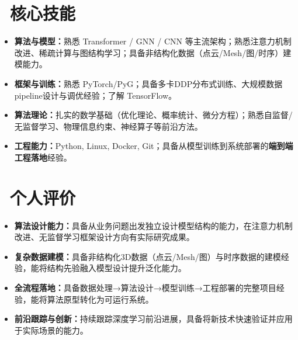 \documentclass[11pt]{article}
\begin{document}
  
\section{\makebox[\widthof{\faCogs}][c]{\color{CVBlue}\faCogs}\ 核心技能}
    
\begin{itemize}
    \item \textbf{算法与模型：}熟悉 Transformer / GNN / CNN 等主流架构；熟悉注意力机制改进、稀疏计算与图结构学习；具备非结构化数据（点云/Mesh/图/时序）建模能力。
    \item \textbf{框架与训练：}熟悉 PyTorch/PyG；具备多卡DDP分布式训练、大规模数据pipeline设计与调优经验；了解 TensorFlow。
    \item \textbf{算法理论：}扎实的数学基础（优化理论、概率统计、微分方程）；熟悉自监督/无监督学习、物理信息约束、神经算子等前沿方法。
    \item \textbf{工程能力：}Python, Linux, Docker, Git；具备从模型训练到系统部署的\textbf{端到端工程落地}经验。
\end{itemize}

\section{\makebox[\widthof{\faUser}][c]{\color{CVBlue}\faUser}\ 个人评价}

\begin{itemize}
    \item \textbf{算法设计能力：}具备从业务问题出发独立设计模型结构的能力，在注意力机制改进、无监督学习框架设计方向有实际研究成果。
    \item \textbf{复杂数据建模：}具备非结构化3D数据（点云/Mesh/图）与时序数据的建模经验，能将结构先验融入模型设计提升泛化能力。
    \item \textbf{全流程落地：}具备数据处理→算法设计→模型训练→工程部署的完整项目经验，能将算法原型转化为可运行系统。
    \item \textbf{前沿跟踪与创新：}持续跟踪深度学习前沿进展，具备将新技术快速验证并应用于实际场景的能力。
\end{itemize}
\end{document}
